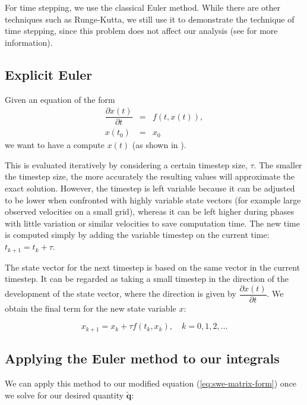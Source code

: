 \documentclass{article}
\newcommand{\pd}[2]{\dfrac{\partial #1}{\partial #2}}
\begin{document}
For time stepping, we use the classical Euler method. While there are other techniques such as Runge-Kutta, we still use it to demonstrate the technique of time stepping, since this problem does not affect our analysis (see \cite{hans2009schwarz} for more information).

\subsection{Explicit Euler}
\label{subsec:explicit-euler}

Given an equation of the form
\begin{eqnarray}
  \label{eq:euler-method-setting}
  \pd{x(t)}{t} & = & f(t, x(t)), \\
  x(t_0) & = & x_0
\end{eqnarray}
we want to have a compute $x(t)$ (as shown in \cite{schwaiger08adaptive}).

This is evaluated iteratively by considering a certain timestep size, $\tau$. The smaller the timestep size, the more accurately the resulting values will approximate the exact solution. However, the timestep is left variable because it can be adjusted to be lower when confronted with highly variable state vectors (for example large observed velocities on a small grid), whereas it can be left higher during phases with little variation or similar velocities to save computation time. The new time is computed simply by adding the variable timestep on the current time: $t_{k+1} = t_k + \tau$.

The state vector for the next timestep is based on the same vector in the current timestep. It can be regarded as taking a small timestep in the direction of the development of the state vector, where the direction is given by $\pd{x(t)}{t}$. We obtain the final term for the new state variable $x$:

\begin{equation}
  \label{eq:euler-step-solution}
  x_{k+1} = x_k + \tau f(t_k, x_k), \quad k=0,1,2,\dots
\end{equation}

\subsection{Applying the Euler method to our integrals}
\label{subsec:euler-method-applied}

We can apply this method to our modified equation (\ref{eq:swe-matrix-form}) once we solve for our desired quantity $\tilde{\mathbf{q}}$:
\end{document}

